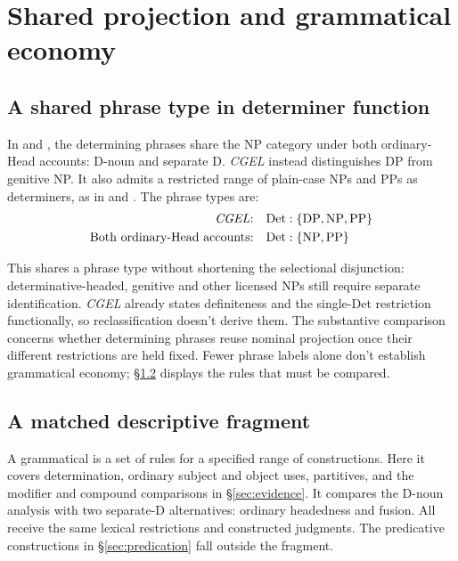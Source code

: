 \documentclass[12pt]{article}
\begin{document}
\section{Shared projection and grammatical economy}\label{sec:economy}

\subsection{A shared phrase type in determiner function}\label{sec:det-uniform}

In  and , the determining phrases share the NP category under both ordinary-Head accounts: D-noun and separate D. \textit{CGEL} instead distinguishes DP from genitive NP. It also admits a restricted range of plain-case NPs and PPs as determiners, as in  and  \citep[Ch.~5, §4]{huddleston2002}. The phrase types are:
\[
\begin{aligned}
\text{\textit{CGEL}:} &\quad \mathrm{Det}:\{\mathrm{DP},\mathrm{NP},\mathrm{PP}\} \\
\text{Both ordinary-Head accounts:} &\quad \mathrm{Det}:\{\mathrm{NP},\mathrm{PP}\}
\end{aligned}
\]

This shares a phrase type without shortening the selectional disjunction: determinative-headed, genitive and other licensed NPs still require separate identification. \textit{CGEL} already states definiteness and the single-Det restriction functionally, so reclassification doesn't derive them. The substantive comparison concerns whether determining phrases reuse nominal projection once their different restrictions are held fixed. Fewer phrase labels alone don't establish grammatical economy; §\ref{sec:fragment} displays the rules that must be compared.

\subsection{A matched descriptive fragment}\label{sec:fragment}

A grammatical  is a set of rules for a specified range of constructions. Here it covers determination, ordinary subject and object uses, partitives, and the modifier and compound comparisons in §\ref{sec:evidence}. It compares the D-noun analysis with two separate-D alternatives: ordinary headedness and fusion. All receive the same lexical restrictions and constructed judgments. The predicative constructions in §\ref{sec:predication} fall outside the fragment.
\end{document}
